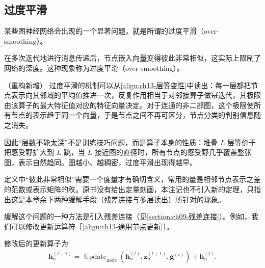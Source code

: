 \documentclass[../../main.tex]{subfiles}
\begin{document}
\subsection{过度平滑}\label{subsection:ch13-过度平滑}

某些图神经网络会出现的一个显著问题，就是所谓的过度平滑（over-smoothing）。

\begin{definition}[过度平滑]\label{definition:ch13-过度平滑}
在多次迭代地进行消息传递后，节点嵌入向量变得彼此非常相似，这实际上限制了网络的深度。这种现象称为过度平滑（over-smoothing）。
\end{definition}

\begin{remark}（重构新增）
过度平滑的机制可以从\eqref{align:ch13-层等变性}中读出：每一层都把节点表示向其邻域的平均值推进一次，反复作用相当于对邻接算子做幂迭代，其极限由该算子的最大特征值对应的特征向量决定。对于连通的非二部图，这个极限使所有节点的表示趋于同一个向量，于是节点之间不再可区分，节点分类的判别信息随之消失。\par
因此“层数不能太深”不是训练技巧问题，而是算子本身的性质：堆叠 $L$ 层等价于把感受野扩大到 $L$ 跳，当 $L$ 接近图的直径时，所有节点的感受野几乎覆盖整张图，表示自然趋同。图越小、越稠密，过度平滑出现得越早。\par
定义中“彼此非常相似”需要一个度量才有确切含义，常用的量是相邻节点表示之差的范数或表示矩阵的秩。原书没有给出定量刻画，本注记也不引入新的定理，只指出这是本章余下两种缓解手段（残差连接与多层读出）所针对的现象。
\end{remark}

缓解这个问题的一种方法是引入残差连接（见\cref{section:ch09-残差连接}）。例如，我们可以修改更新运算符［\eqref{align:ch13-通用节点更新}］。

\begin{definition}[残差式更新算子]\label{definition:ch13-残差更新}
修改后的更新算子为
\begin{align}
\bm{h}_n^{(l+1)}=\operatorname{Update}_{\mathrm{node}}\!\left(\bm{h}_n^{(l)},\bm{z}_n^{(l+1)},\bm{g}^{(l)}\right)+\bm{h}_n^{(l)}.
\label{align:ch13-残差}
\end{align}
\end{definition}
\end{document}
